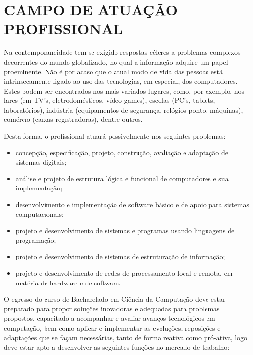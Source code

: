 \chapter{CAMPO DE ATUAÇÃO PROFISSIONAL}

Na contemporaneidade tem-se exigido respostas céleres a problemas complexos decorrentes do mundo globalizado, no qual a informação adquire um papel proeminente. Não é por acaso que o atual modo de vida das pessoas está intrinsecamente ligado ao uso das tecnologias, em especial, dos computadores. Estes podem ser encontrados nos mais variados lugares, como, por exemplo, nos lares (em TV's, eletrodomésticos, vídeo games), escolas (PC's, tablets, laboratórios), indústria (equipamentos de segurança, relógios-ponto, máquinas), comércio (caixas registradoras), dentre outros. 

Desta forma, o profissional atuará possivelmente nos seguintes problemas:

\begin{itemize}
    \item concepção, especificação, projeto, construção, avaliação e adaptação de sistemas digitais;
    \item análise e projeto de estrutura lógica e funcional de computadores e sua implementação;
    \item desenvolvimento e implementação de software básico e de apoio para sistemas computacionais;
    \item projeto e desenvolvimento de sistemas e programas usando linguagens de programação;
    \item projeto e desenvolvimento de sistemas de estruturação de informação;
    \item projeto e desenvolvimento de redes de processamento local e remota, em matéria de hardware e de software.    
\end{itemize}

O egresso do curso de Bacharelado em Ciência da Computação deve estar preparado para propor soluções inovadoras e adequadas para problemas propostos, capacitado a acompanhar e avaliar avanços tecnológicos em computação, bem como aplicar e implementar as evoluções, reposições e adaptações que se façam necessárias, tanto de forma reativa como pró-ativa, logo deve estar apto a desenvolver as seguintes funções no mercado de trabalho:

